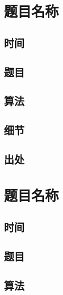 \documentclass[a4paper]{article}
\begin{document}
		
		
	\newpage
	
	\section{题目名称}
		
	\subsection{时间}
		
		
		
	\subsection{题目}
		
		
		
	\subsection{算法}
		
		
		
	\subsection{细节}
		
		
		
	\subsection{出处}
		
		
	
	\newpage
	
	\section{题目名称}
		
	\subsection{时间}
		
		
		
	\subsection{题目}
		
		
		
	\subsection{算法}
		
\end{document}
